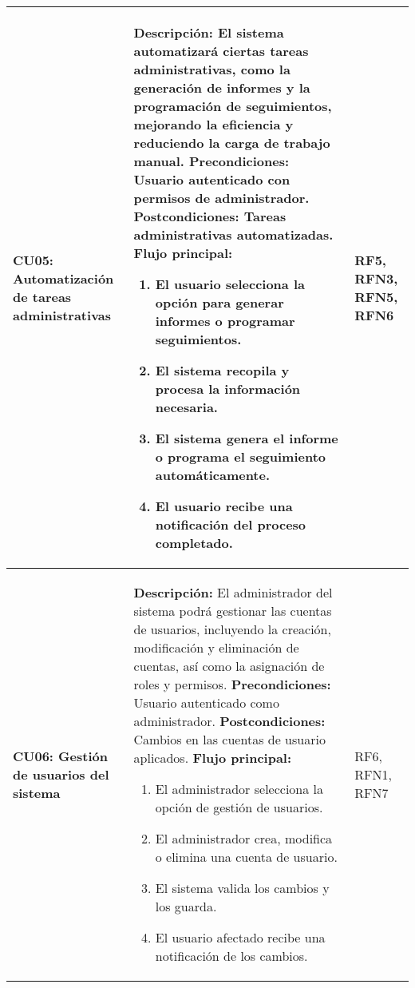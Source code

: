 \begin{longtable}{|p{3cm}|p{9cm}|p{2cm}|}
	\textbf{CU05: Automatización de tareas administrativas} & 
	\textbf{Descripción:} El sistema automatizará ciertas tareas administrativas, como la generación de informes y la programación de seguimientos, mejorando la eficiencia y reduciendo la carga de trabajo manual.
	\newline \textbf{Precondiciones:} Usuario autenticado con permisos de administrador.
	\newline \textbf{Postcondiciones:} Tareas administrativas automatizadas.
	\newline \textbf{Flujo principal:}
	\begin{enumerate}
		\item El usuario selecciona la opción para generar informes o programar seguimientos.
		\item El sistema recopila y procesa la información necesaria.
		\item El sistema genera el informe o programa el seguimiento automáticamente.
		\item El usuario recibe una notificación del proceso completado.
	\end{enumerate}
	& RF5, RFN3, RFN5, RFN6 \\
	\hline
	
	\textbf{CU06: Gestión de usuarios del sistema} & 
	\textbf{Descripción:} El administrador del sistema podrá gestionar las cuentas de usuarios, incluyendo la creación, modificación y eliminación de cuentas, así como la asignación de roles y permisos.
	\newline \textbf{Precondiciones:} Usuario autenticado como administrador.
	\newline \textbf{Postcondiciones:} Cambios en las cuentas de usuario aplicados.
	\newline \textbf{Flujo principal:}
	\begin{enumerate}
		\item El administrador selecciona la opción de gestión de usuarios.
		\item El administrador crea, modifica o elimina una cuenta de usuario.
		\item El sistema valida los cambios y los guarda.
		\item El usuario afectado recibe una notificación de los cambios.
	\end{enumerate}
	& RF6, RFN1, RFN7 \\
	\hline
	

\end{longtable}

